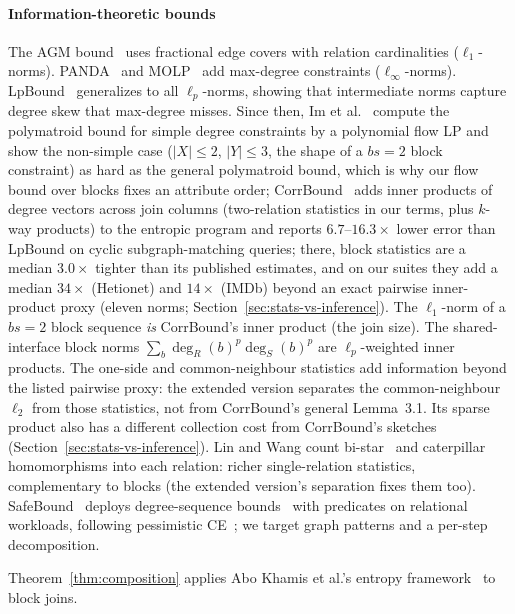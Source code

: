 \documentclass[conference]{IEEEtran}
\begin{document}
\paragraph{Information-theoretic bounds}
The AGM bound~\cite{atserias2008agm} uses fractional edge covers
with relation cardinalities ($\ell_1$-norms).
PANDA~\cite{abokhamis2017panda} and MOLP~\cite{joglekar2016molp} add
max-degree constraints ($\ell_\infty$-norms).
LpBound~\cite{zhang2025lpbound} generalizes to all $\ell_p$-norms,
showing that intermediate norms capture degree skew that max-degree
misses.
Since then, Im et al.~\cite{im2025simple} compute the polymatroid bound for simple degree
constraints by a polynomial flow LP and show the non-simple case
($|X|{\le}2$, $|Y|{\le}3$, the shape of a $bs{=}2$ block constraint)
as hard as the general polymatroid bound, which is why our flow bound over blocks fixes an attribute order;
CorrBound~\cite{mayer2026corrbound} adds inner products of degree
vectors across join columns (two-relation statistics in our
terms, plus $k$-way products) to the entropic program and reports $6.7$--$16.3\times$ lower error than LpBound on cyclic subgraph-matching queries; there, block statistics are a median $3.0\times$ tighter than its published estimates, and on our suites they add a median $34\times$ (Hetionet) and $14\times$ (IMDb) beyond an exact pairwise inner-product proxy (eleven norms; Section~\ref{sec:stats-vs-inference}).  The
$\ell_1$-norm of a $bs{=}2$ block sequence \emph{is} CorrBound's inner
product (the join size).  The shared-interface block norms
$\sum_b \deg_R(b)^p\deg_S(b)^p$ are $\ell_p$-weighted inner products.
The one-side and common-neighbour statistics add information beyond the listed pairwise proxy: the extended version separates the common-neighbour $\ell_2$ from those statistics, not from CorrBound's general Lemma~3.1. Its sparse product also has a different collection cost from CorrBound's sketches (Section~\ref{sec:stats-vs-inference}).
Lin and Wang count bi-star~\cite{lin2025ambidextrous} and caterpillar~\cite{lin2026sidorenko} homomorphisms into each relation: richer single-relation statistics, complementary to blocks (the extended version's separation fixes them too).
SafeBound~\cite{deeds2023safebound} deploys degree-sequence
bounds~\cite{deeds2023dsb} with
predicates on relational workloads, following pessimistic
CE~\cite{cai2019pessimistic}; we target graph patterns and a per-step
decomposition.

Theorem~\ref{thm:composition} applies Abo Khamis et al.'s entropy framework~\cite{abokhamis2024lpnorm} to block joins.
\end{document}
